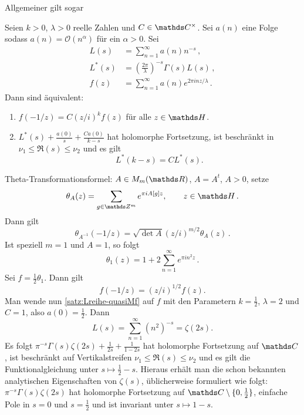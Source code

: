 Allgemeiner gilt sogar

\begin{satz}\label{satz:Lreihe-quasiMf}
	Seien $k > 0$, $\lambda >0$ reelle Zahlen und $C \in \CC^\times$. Sei $a(n)$ eine Folge sodass $a(n) = \mathcal O(n^\alpha)$ für ein $\alpha > 0$. Sei
	\begin{align*}
	L(s) &= \sum_{n=1}^\infty a(n)n^{-s}\,,\\
	L^*(s) &= \left( \frac{2\pi}{\lambda}\right)^{-s} \Gamma(s) L(s)\,,\\
	f(z) &= \sum_{n=1}^\infty a(n)e^{2\pi i nz/\lambda}\,.
	\end{align*}
	Dann sind äquivalent: 
	\begin{enumerate}
		\item $f(-1/z) = C (z/i)^{k} f(z)$ für alle $z \in \HH$.
		\item $L^*(s) + \frac{a(0)}{s} + \frac{Ca(0)}{k - s}$ hat holomorphe Fortsetzung, ist beschränkt in $\nu_1 \leq \Re(s) \leq \nu_2$ und es gilt 
		\[L^*(k - s) = C L^*(s).\]
	\end{enumerate}
\end{satz}


\begin{bsp}
	Theta-Transformationsformel: $A \in M_m(\RR)$, $A = A^t$, $A > 0$, setze
	\[
	\theta_A(z) = \sum_{g \in \ZZ^m} e^{\pi i A[g] z}, \qquad z \in \HH\,.
	\]
	Dann gilt 
	\[
	\theta_{A^{-1}}(-1/z) = \sqrt{\det A} (z / i)^{m/2} \theta_A(z)\,.
	\]
	Ist speziell $m=1$ und $A = 1$, so folgt 
	\[
	\theta_1(z) = 1 + 2\sum_{n=1}^\infty e^{\pi i n^2 z}\,.
	\]
	Sei $f = \frac12 \theta_1$. Dann gilt
	\[
	f(-1/z) = (z/i)^{1/2} f(z).
	\]
	Man wende nun \autoref{satz:Lreihe-quasiMf} auf $f$ mit den Parametern $k = \frac12$, $\lambda = 2$ und $C = 1$, also $a(0) = \frac12$. Dann
	\[
	L(s) = \sum_{n=1}^\infty (n^{2})^{-s} = \zeta(2s).
	\]
	Es folgt $\pi^{-s} \Gamma(s)\zeta(2s) + \frac{1}{2s} + \frac{1}{1-2s}$ hat holomorphe Fortsetzung auf $\CC$, ist beschränkt auf Vertikalstreifen $\nu_1 \leq \Re(s) \leq \nu_2$ und es gilt die Funktionalgleichung unter $s \mapsto \frac12 - s$. Hieraus erhält man die schon bekannten analytischen Eigenschaften von $\zeta(s)$, üblicherweise formuliert wie folgt: $\pi^{-s}\Gamma(s)\zeta(2s)$ hat holomorphe Fortsetzung auf $\CC \setminus \{0,\frac 12\}$, einfache Pole in $s= 0$ und $s=\frac 12$ und ist invariant  unter $s \mapsto 1 - s$.
\end{bsp} 